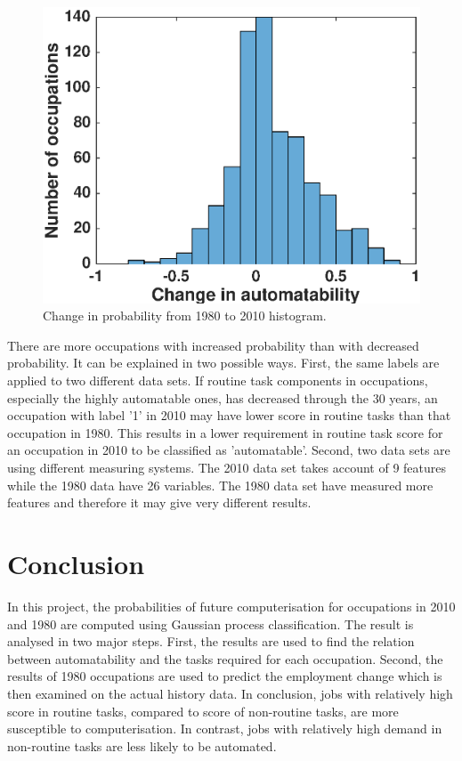 \documentclass[11pt]{report}
\numberwithin{equation}{chapter}
\begin{document}
\begin{spacing}{2}
\begin{figure}[!htb]
\centering
\includegraphics[scale=0.6]{hist.eps}
\caption{Change in probability from 1980 to 2010 histogram. }
\label{fig:hist}
\end{figure}

There are more occupations with increased probability than with decreased probability. It can be explained in two possible ways. First, the same labels are applied to two different data sets. If routine task components in occupations, especially the highly automatable ones, has decreased through the 30 years, an occupation with label '1' in 2010 may have lower score in routine tasks than that occupation in 1980. This results in a lower requirement in routine task score for an occupation in 2010 to be classified as 'automatable'. Second, two data sets are using different measuring systems. The 2010 data set takes account of 9 features while the 1980 data have 26 variables. The 1980 data set have measured more features and therefore it may give very different results. 


\chapter{Conclusion}

In this project, the probabilities of future computerisation for occupations in 2010 and 1980 are computed using Gaussian process classification. The result is analysed in two major steps. First, the results are used to find the relation between automatability and the tasks required for each occupation. Second, the results of 1980 occupations are used to predict the employment change which is then examined on the actual history data. In conclusion, jobs with relatively high score in routine tasks, compared to score of non-routine tasks, are more susceptible to computerisation. In contrast, jobs with relatively high demand in non-routine tasks are less likely to be automated. 


\end{spacing}
\end{document}
